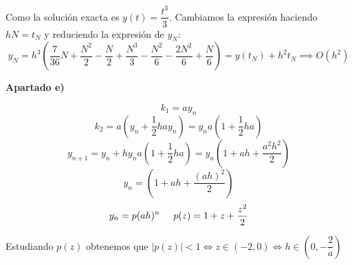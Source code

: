 \documentclass[openany]{book}
\begin{document}
    Como la solución exacta es $ y(t) = \dfrac{t^3}{3} $. Cambiamos la expresión haciendo $ hN = t_{N} $ y reduciendo la expresión de $ y_{N} $:
    $$ y_{N} = h^3 \left( \dfrac{7}{36}N+\dfrac{N^2}{2}-\dfrac{N}{2}+\dfrac{N^3}{3}-\dfrac{N^2}{6}-\dfrac{2N^2}{6}+\dfrac{N}{6} \right) = y(t_{N}) + h^2t_{N} \implies O(h^2)$$

    \textbf{Apartado e)}

    $$ k_1 = ay_n $$
    $$ k_2 = a(y_n+\dfrac{1}{2}hay_n) = y_n a(1+\dfrac{1}{2}ha) $$
    $$ y_{n+1} = y_n +h y_n a(1+\dfrac{1}{2}ha) = y_n(1+ah+\dfrac{a^2h^2}{2}) $$
    $$ y_n = \left(1+ah+\dfrac{(ah)^2}{2}\right) $$
    $$ y_n = p (ah)^{n} \hspace{5mm} p(z) = 1+z+\dfrac{z^2}{2} $$

    Estudiando $ p(z) $ obtenemos que $ |p(z)| <1 \iff z \in (-2,0) \iff h \in (0,-\dfrac{2}{a}) $
\end{document}
